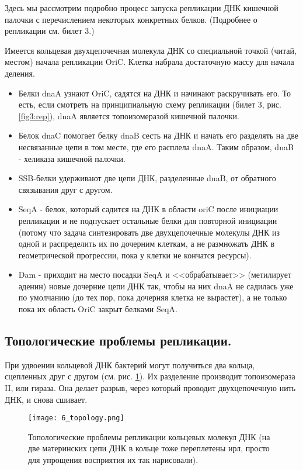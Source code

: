 Здесь мы рассмотрим подробно процесс запуска репликации ДНК кишечной палочки с перечислением некоторых конкретных белков. (Подробнее о репликации см. билет 3.)

Имеется кольцевая двухцепочечная молекула ДНК со специальной точкой (читай, местом) начала репликации OriC. Клетка набрала достаточную массу для начала деления. 

\begin{itemize}
    \item Белки dnaA узнают OriC, садятся на ДНК и начинают раскручивать его. То есть, если смотреть на принципиальную схему репликации (билет 3, рис. \ref{fig3:rep}), dnaA является топоизомеразой кишечной палочки.
    
    \item Белок dnaC помогает белку dnaB сесть на ДНК и начать его разделять на две несвязанные цепи в том месте, где его расплела dnaA. Таким образом, dnaB - хеликаза кишечной палочки.
    
    \item SSB-белки удерживают две цепи ДНК, разделенные dnaB, от обратного связывания друг с другом.
    
    \item SeqA - белок, который садится на ДНК в области oriC после инициации репликации и не подпускает остальные белки для повторной инициации (потому что задача синтезировать две двухцепочечные молекулы ДНК из одной и распределить их по дочерним клеткам, а не размножать ДНК в геометрической прогрессии, пока у клетки не кончатся ресурсы).
    
    \item Dam - приходит на место посадки SeqA и <<обрабатывает>> (метилирует аденин) новые дочерние цепи ДНК так, чтобы на них dnaA не садилась уже по умолчанию (до тех пор, пока дочерняя клетка не вырастет), а не только пока их область OriC закрыт белками SeqA.
\end{itemize}

\subsection{Топологические проблемы репликации.}

При удвоении кольцевой ДНК бактерий могут получиться два кольца, сцепленных друг с другом (см. рис. \ref{fig:6_topology}). Их разделение производит топоизомераза II, или гираза. Она делает разрыв, через который проводит двухцепочечную нить ДНК, и снова сшивает.

\begin{figure}[H]
    \centering
    \texttt{[image: 6\_topology.png]}
    \caption{Топологические проблемы репликации кольцевых молекул ДНК (на две материнских цепи ДНК в кольце тоже переплетены ирл, просто для упрощения восприятия их так нарисовали).}
    \label{fig:6_topology}
\end{figure}

